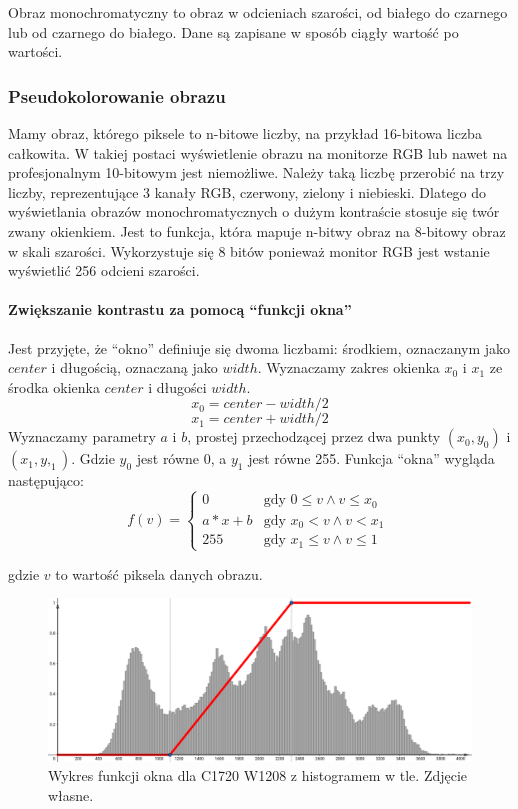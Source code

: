 \label{sec:algorithm-pixmap-monochrome}

Obraz monochromatyczny to obraz w odcieniach szarości, od białego do czarnego lub od czarnego do białego. Dane są zapisane w sposób ciągły wartość po wartości.

\subsubsection{Pseudokolorowanie obrazu}

Mamy obraz, którego piksele to n-bitowe liczby, na przykład 16-bitowa liczba całkowita.
W takiej postaci wyświetlenie obrazu na monitorze RGB lub nawet na profesjonalnym 10-bitowym jest niemożliwe.
Należy taką liczbę przerobić na trzy liczby, reprezentujące 3 kanały RGB, czerwony, zielony i niebieski.
Dlatego do wyświetlania obrazów monochromatycznych o dużym kontraście stosuje się twór zwany okienkiem.
Jest to funkcja, która mapuje n-bitwy obraz na 8-bitowy obraz w skali szarości.
Wykorzystuje się 8 bitów ponieważ monitor RGB jest wstanie wyświetlić 256 odcieni szarości.

\paragraph*{Zwiększanie kontrastu za pomocą \enquote{funkcji okna}}
Jest przyjęte, że \enquote{okno} definiuje się dwoma liczbami: środkiem, oznaczanym jako $center$ i długością, oznaczaną jako $width$.
Wyznaczamy zakres okienka $x_0$ i $x_1$ ze środka okienka $center$ i długości $width$.
\[x_0 = center - width / 2\]
\[x_1 = center + width / 2\]
Wyznaczamy parametry $a$ i $b$, prostej przechodzącej przez dwa punkty $(x_0, y_0)$ i $(x_1, y,_1)$.
Gdzie $y_0$ jest równe 0, a $y_1$ jest równe 255.
Funkcja \enquote{okna} wygląda następująco:
\[
    f(v)=
    \begin{cases}
        0     & \text{gdy $0 \le v \wedge v \le x_0$ } \\
        a*x+b & \text{gdy $x_0 < v \wedge v < x_1$}    \\
        255   & \text{gdy $x_1 \le v \wedge v \le 1$ }
    \end{cases}
\]

gdzie $v$ to wartość piksela danych obrazu.

\begin{figure}[!htbp]
    \centering
    \includegraphics[width=\textwidth]{img/windowing-chart.png}
    \caption{Wykres funkcji okna dla C1720 W1208 z histogramem w tle. Zdjęcie własne.}
    \label{fig:algorithm-pixmap-monochrome-window-chart}
\end{figure}

